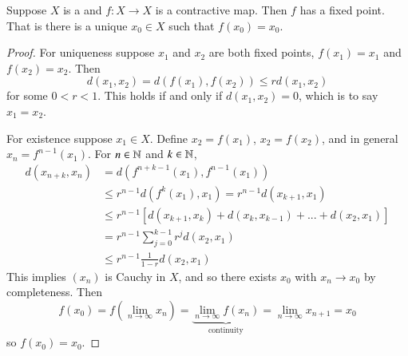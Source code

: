 \begin{theorem}
    Suppose $X$ is a  and $f:X\rightarrow X$ is a contractive map. Then $f$ has a  fixed point. That is there is a unique $x_0 \in X$ such that $f(x_0) = x_0$.
\end{theorem}
\begin{proof}
    For uniqueness suppose $x_1$ and $x_2$ are both fixed points, $f(x_1) = x_1$ and $f(x_2) = x_2$. Then $$d(x_1,x_2) = d(f(x_1),f(x_2)) \leq rd(x_1,x_2)$$ for some $0 < r < 1$. This holds if and only if $d(x_1,x_2) = 0$, which is to say $x_1 = x_2$. 

    For existence suppose $x_1 \in X$. Define $x_2 = f(x_1)$, $x_2 = f(x_2)$, and in general $x_n = f^{n-1}(x_1)$. For $n \in \mathbb N$ and $k \in \mathbb N$, \begin{align*}
        d(x_{n+k},x_n) &= d(f^{n+k-1}(x_1),f^{n-1}(x_1)) \\
        &\leq r^{n-1}d(f^k(x_1),x_1) = r^{n-1}d(x_{k+1},x_1) \\
        &\leq r^{n-1}[d(x_{k+1},x_k)+d(x_k,x_{k-1})+...+d(x_2,x_1)] \\
        &=r^{n-1}\sum_{j=0}^{k-1}r^jd(x_2,x_1) \\
        &\leq r^{n-1}\frac{1}{1-r}d(x_2,x_1)
    \end{align*}
    This implies $(x_n)$ is Cauchy in $X$, and so there exists $x_0$ with $x_n\rightarrow x_0$ by completeness. Then $$f(x_0) = f(\lim\limits_{n\rightarrow \infty}x_n) = \underbrace{\lim\limits_{n\rightarrow\infty}f(x_n)}_{\text{continuity}} = \lim\limits_{n\rightarrow \infty}x_{n+1} = x_0$$ so $f(x_0) = x_0$.
\end{proof}


